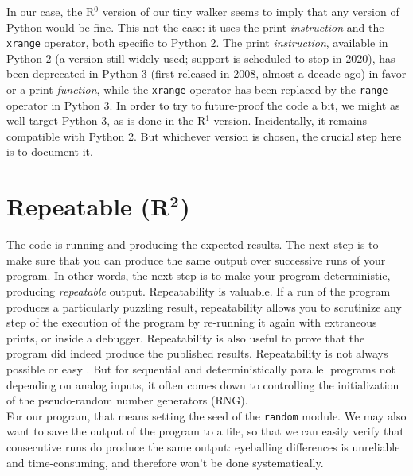 \documentclass[a4paper,11pt]{article}
\begin{document}
In our case, the R$^0$ version of our tiny walker seems to imply that any version of Python would be fine. This not the case: it uses the print {\em instruction} and the {\tt xrange} operator, both specific to Python 2. The print {\em instruction}, available in Python 2 (a version still widely used; support is scheduled to stop in 2020), has been deprecated in Python 3 (first released in 2008, almost a decade ago) in favor or a  print {\em function}, while the {\tt xrange} operator has been replaced by the {\tt range} operator in Python 3. In order to try to future-proof the code a bit, we might as well target Python 3, as is done in the R$^1$ version. Incidentally, it remains compatible with Python 2. But whichever version is chosen, the crucial step here is to document it.


\section*{Repeatable (R$^{\mathbf 2}$)}

The code is running and producing the expected results. The next step is to make sure that you can produce the same output over successive runs of your program. In other words, the next step is to make your program deterministic, producing {\em repeatable} output.  Repeatability is valuable. If a run of the program produces a particularly puzzling result, repeatability allows you to scrutinize any step of the execution of the program by re-running it again with extraneous prints, or inside a debugger. Repeatability is also useful to prove that the program did indeed produce the published results. Repeatability is not always possible or easy \citep{Diethelm:2012, Courtes:2015}. But for sequential and deterministically parallel programs \citep{Hines:2008, Collange:2015} not depending on analog inputs, it often comes down to controlling the initialization of the pseudo-random number generators (RNG).\\

For our program, that means setting the seed of the {\tt random} module. We may also want to save the output of the program to a file, so that we can easily verify that consecutive runs do produce the same output: eyeballing differences is unreliable and  time-consuming, and therefore won't be done systematically.\\
\end{document}
